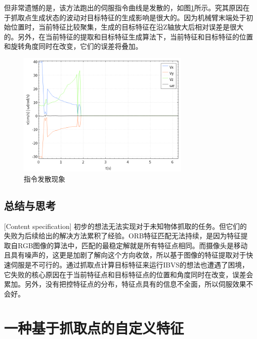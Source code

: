 \documentclass[fontset=fandol,type=bachelor,campus=harbin,bsmainpagenumberline=true]{hithesisbook}
\begin{document}
但非常遗憾的是，该方法跑出的伺服指令曲线是发散的，如图\ref{指令发散现象}所示。究其原因在于抓取点生成状态的波动对目标特征的生成影响是很大的。因为机械臂末端处于初始位置时，当前特征比较聚集，生成的目标特征在沿Z轴放大后相对误差是很大的。另外，在当前特征的提取和目标特征生成算法下，当前特征和目标特征的位置和旋转角度同时在改变，它们的误差将叠加。
\begin{figure}[h]
\centering
\includegraphics[width = 0.75\textwidth]{chapter4/指令发散}
\caption{指令发散现象}
\label{指令发散现象}
\end{figure}


\subsection{总结与思考}[Content specification]
初步的想法无法实现对于未知物体抓取的任务。但它们的失败为后续给出的解决方法累积了经验。ORB特征匹配无法持续，是因为特征提取自RGB图像的算法中，匹配的最稳定解就是所有特征点相同。而摄像头是移动且具有噪声的，这更是加剧了解向这个方向收敛，所以基于图像的特征提取对于快速伺服是不可行的。通过抓取点计算目标特征来运行IBVS的想法也遭遇了困境，它失败的核心原因在于当前特征点和目标特征点的位置和角度同时在改变，误差会累加。另外，没有把控特征点的分布，特征点具有的信息不全面，所以伺服效果不会好。
\section{一种基于抓取点的自定义特征}
\end{document}
